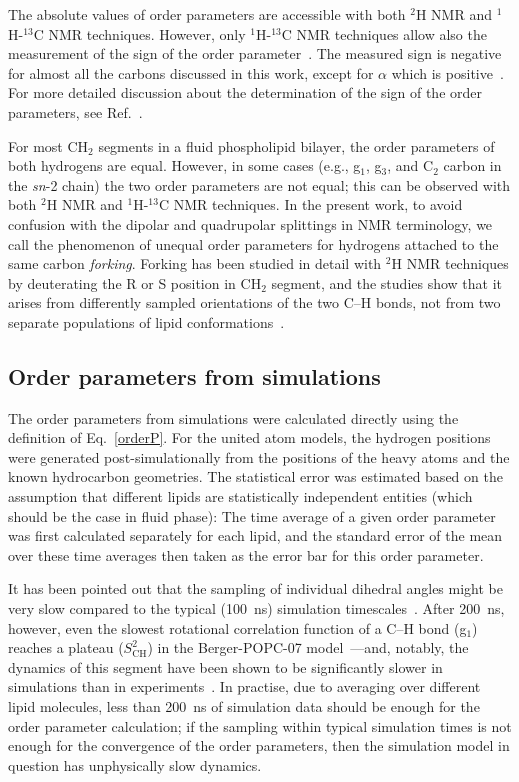 \documentclass[journal=jacsat,manuscript=article]{achemso}
\begin{document}
The absolute values of order parameters are accessible with both $^2$H NMR and $^1$H-$^{13}$C NMR techniques. 
However, only $^1$H-$^{13}$C NMR techniques allow also the measurement of the sign of the order parameter~\cite{hong95a,hong95b,gross97}. 
The measured sign is negative for almost all the carbons discussed in this work, except for $\alpha$ which is positive~\cite{hong95a,hong95b,gross97}. 
For more detailed discussion about the determination of the sign of the order parameters, see Ref.~. 

For most CH$_2$ segments in a fluid phospholipid bilayer, the order parameters of both hydrogens are equal.
However, in some cases (e.g., g$_1$, g$_3$, and  C$_2$ carbon in the \textit{sn}-2 chain) the two order parameters are not equal;
this  can be observed with both $^2$H NMR and $^1$H-$^{13}$C NMR techniques. In the present work,
to avoid confusion with the dipolar and quadrupolar splittings in NMR terminology,
we call the phenomenon of unequal order parameters for hydrogens attached to the same carbon {\it forking}. 
Forking has been studied in detail with $^2$H NMR techniques by deuterating the R or S position in CH$_2$ segment, and
the studies show that it arises from differently sampled orientations of the two C--H bonds, not from two 
separate populations of lipid conformations~\cite{engel81,gally81}.


\subsection{Order parameters from simulations}
The order parameters from simulations were calculated directly using the definition of Eq.~\ref{orderP}.
For the united atom models, the hydrogen positions were generated 
post-simulationally from the positions of the heavy atoms and the known hydrocarbon geometries.
The statistical error was estimated based on the assumption that different lipids are statistically independent 
entities (which should be the case in fluid phase):
The time average of a given order parameter was first calculated separately for each lipid,
and the standard error of the mean over these time averages then taken as the error bar for this order parameter.

It has been pointed out that the sampling of individual dihedral angles might be very
slow compared to the typical (100~ns) simulation timescales~\cite{vogel12}.
After 200~ns, however, even the slowest rotational correlation function of a C--H bond  (g$_1$) reaches
a plateau ($S_\mathrm{CH}^2$) in the Berger-POPC-07 model~\cite{ollila07a}---and, notably,
the dynamics of this segment have been shown to be significantly slower in simulations
than in experiments~\cite{ferreira15}.
In practise,
due to averaging over different lipid molecules,
less than 200~ns of simulation data should be enough for the order parameter calculation;
if the sampling within typical simulation times
is not enough for the convergence of the order parameters,
then the simulation model in question has unphysically slow dynamics.
\end{document}
